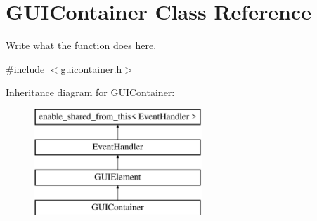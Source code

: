 \hypertarget{classGUIContainer}{\section{G\+U\+I\+Container Class Reference}
\label{classGUIContainer}
}


Write what the function does here.  




{\ttfamily \#include $<$guicontainer.\+h$>$}

Inheritance diagram for G\+U\+I\+Container\+:\begin{figure}[H]
\begin{center}
\leavevmode
\includegraphics[height=4.000000cm]{classGUIContainer}
\end{center}
\end{figure}
